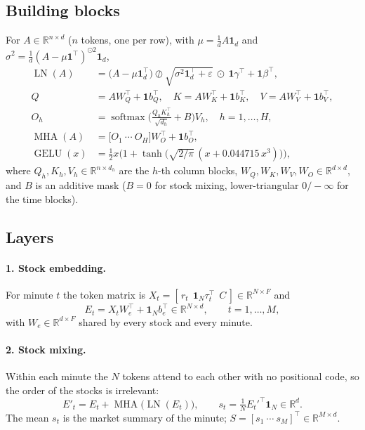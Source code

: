 \documentclass[11pt]{article}
\newcommand{\R}{\mathbb{R}}
\DeclareMathOperator{\LN}{LN}
\DeclareMathOperator{\MHA}{MHA}
\DeclareMathOperator{\GELU}{GELU}
\DeclareMathOperator{\softmax}{softmax}
\begin{document}
\subsection{Building blocks}

For $A\in\R^{n\times d}$ ($n$ tokens, one per row), with $\mu=\tfrac1d A\mathbf 1_d$ and $\sigma^2=\tfrac1d(A-\mu\mathbf 1^{\top})^{\odot 2}\mathbf 1_d$,
\begin{align}
  \LN(A) &= \big(A-\mu\mathbf 1_d^{\top}\big)\oslash\sqrt{\sigma^2\mathbf 1_d^{\top}+\varepsilon}\ \odot\ \mathbf 1\gamma^{\top}+\mathbf 1\beta^{\top},\\
  Q&=AW_Q^{\top}+\mathbf 1b_Q^{\top},\quad K=AW_K^{\top}+\mathbf 1b_K^{\top},\quad V=AW_V^{\top}+\mathbf 1b_V^{\top},\\
  O_h&=\softmax\!\Big(\tfrac{Q_hK_h^{\top}}{\sqrt{d_h}}+B\Big)V_h,\quad h=1,\dots,H,\\
  \MHA(A)&=\big[O_1\ \cdots\ O_H\big]W_O^{\top}+\mathbf 1b_O^{\top},\\
  \GELU(x)&=\tfrac12 x\Big(1+\tanh\!\big(\sqrt{2/\pi}\,(x+0.044715\,x^3)\big)\Big),
\end{align}
where $Q_h,K_h,V_h\in\R^{n\times d_h}$ are the $h$-th column blocks, $W_Q,W_K,W_V,W_O\in\R^{d\times d}$, and $B$ is an additive mask
($B=0$ for stock mixing, lower-triangular $0/-\infty$ for the time blocks).

\subsection{Layers}

\paragraph{1. Stock embedding.} For minute $t$ the token matrix is $X_t=[\,r_t\ \ \mathbf 1_N\tau_t^{\top}\ \ C\,]\in\R^{N\times F}$ and
\begin{equation}
  E_t = X_tW_e^{\top}+\mathbf 1_Nb_e^{\top}\in\R^{N\times d},\qquad t=1,\dots,M,
\end{equation}
with $W_e\in\R^{d\times F}$ shared by every stock and every minute.

\paragraph{2. Stock mixing.} Within each minute the $N$ tokens attend to each other with no positional code, so the order of the stocks is irrelevant:
\begin{equation}
  E'_t=E_t+\MHA\big(\LN(E_t)\big),\qquad s_t=\tfrac1N E_t'^{\top}\mathbf 1_N\in\R^{d}.
\end{equation}
The mean $s_t$ is the market summary of the minute; $S=[s_1\ \cdots\ s_M]^{\top}\in\R^{M\times d}$.
\end{document}
